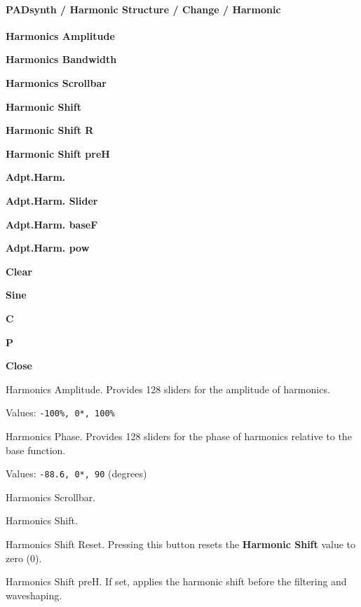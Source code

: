 \paragraph{PADsynth / Harmonic Structure / Change / Harmonic}
\label{paragraph:padsynth_harmonic_structure_change_harmonic}

   \begin{enumber}
      \item \textbf{Harmonics Amplitude}
      \item \textbf{Harmonics Bandwidth}
      \item \textbf{Harmonics Scrollbar}
      \item \textbf{Harmonic Shift}
      \item \textbf{Harmonic Shift R}
      \item \textbf{Harmonic Shift preH}
      \item \textbf{Adpt.Harm.}
      \item \textbf{Adpt.Harm. Slider}
      \item \textbf{Adpt.Harm. baseF}
      \item \textbf{Adpt.Harm. pow}
      \item \textbf{Clear}
      \item \textbf{Sine}
      \item \textbf{C}
      \item \textbf{P}
      \item \textbf{Close}
   \end{enumber}

   Harmonics Amplitude.
   Provides 128 sliders for the amplitude of harmonics.

   Values: \texttt{-100\%, 0*, 100\%}

   Harmonics Phase.
   Provides 128 sliders for the phase of harmonics relative to the base function.

   Values: \texttt{-88.6, 0*, 90} (degrees)

   Harmonics Scrollbar.

   Harmonics Shift.

   Harmonics Shift Reset.
   Pressing this button resets the \textbf{Harmonic Shift} value to zero
   (0).

   Harmonics Shift preH.
   If set, applies the harmonic shift before the filtering and waveshaping.


